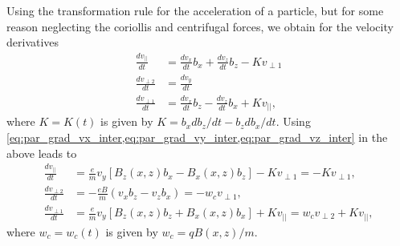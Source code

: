 \documentclass[oneside,a4paper,11pt]{report}
\begin{document}
Using the transformation rule for the acceleration of a particle, but for some reason neglecting the coriollis and centrifugal forces, we obtain for the velocity derivatives
\begin{align}
    \frac{dv_{||}}{dt} &= \frac{dv_x}{dt} b_x + \frac{dv_z}{dt} b_z  - K v_{\perp1} \\
    \frac{dv_{\perp2}}{dt} &= \frac{dv_y}{dt}\\
    \frac{dv_{\perp1}}{dt} &= \frac{dv_x}{dt} b_z - \frac{dv_z}{dt} b_x + K v_{||},
\end{align}
where $K = K(t)$ is given by $K = b_x db_z/dt - b_z db_x/dt$. Using \cref{eq:par_grad_vx_inter,eq:par_grad_vy_inter,eq:par_grad_vz_inter} in the above leads to
\begin{align}
    \frac{d v_{||}}{dt} &= \frac{e}{m} v_y [B_z(x,z) b_x - B_x(x,z) b_z] - Kv_{\perp1} = -Kv_{\perp1}, \label{eq:par_grad_vpar_inter} \\
    \frac{dv_{\perp2}}{dt} &= -\frac{eB}{m} (v_x b_z - v_z b_x) = -w_c v_{\perp1}, \label{eq:par_grad_v2_inter} \\
    \frac{dv_{\perp1}}{dt} &= \frac{e}{m} v_y [B_z(x,z) b_z + B_x(x,z) b_x] + Kv_{||} = w_c v_{\perp2} + K v_{||}, \label{eq:par_grad_v1_inter}
\end{align}
where $w_c = w_c(t)$ is given by $w_c = q B(x,z) / m$.
\end{document}
